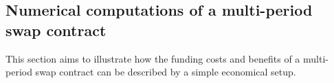\documentclass[main.tex]{subfiles}
\begin{document}
    \subsection{Numerical computations of a multi-period swap contract}
        This section aims to illustrate how the funding costs and benefits of a multi-period swap contract can be described by a simple economical setup.
\end{document}
